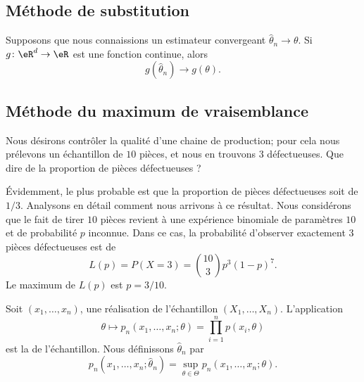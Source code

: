 \subsection{Méthode de substitution}

Supposons que nous connaissions un estimateur convergeant \( \hat\theta_n\to\theta\). Si \( g\colon \eR^d\to \eR\) est une fonction continue, alors
\begin{equation}
    g(\hat\theta_n)\to g(\theta).
\end{equation}

\subsection{Méthode du maximum de vraisemblance}

\begin{example}     \label{ExVrasMaxLp}
    Nous désirons contrôler la qualité d'une chaine de production; pour cela nous prélevons un échantillon de \( 10\) pièces, et nous en trouvons \( 3\) défectueuses. Que dire de la proportion de pièces défectueuses ?

    Évidemment, le plus probable est que la proportion de pièces défectueuses soit de \( 1/3\). Analysons en détail comment nous arrivons à ce résultat. Nous considérons que le fait de tirer \( 10\) pièces revient à une expérience binomiale de paramètres \( 10\) et de probabilité \( p\) inconnue. Dans ce cas, la probabilité d'observer exactement \( 3\) pièces défectueuses est de
    \begin{equation}
        L(p)=P(X=3)={10\choose 3}p^3(1-p)^{7}.
    \end{equation}
    Le maximum de \( L(p)\) est \( p=3/10\).

    \newcommand{\CaptionFigMaxVraissLp}{La fonction de vraisemblance de l'exemple~\ref{ExVrasMaxLp}.}
    
\end{example}

Soit \( (x_1,\ldots,x_n)\), une réalisation de l'échantillon \( (X_1,\ldots,X_n)\). L'application
\begin{equation}
    \theta\mapsto p_n(x_1,\ldots,x_n;\theta)=\prod_{i=1}^np(x_i,\theta)
\end{equation}
est la  de l'échantillon. Nous définissons \( \hat\theta_n\) par
\begin{equation}
    p_n(x_1,\dots,x_n;\hat\theta_n)=\sup_{\theta\in\Theta}p_n(x_1,\ldots,x_n;\theta).
\end{equation}

